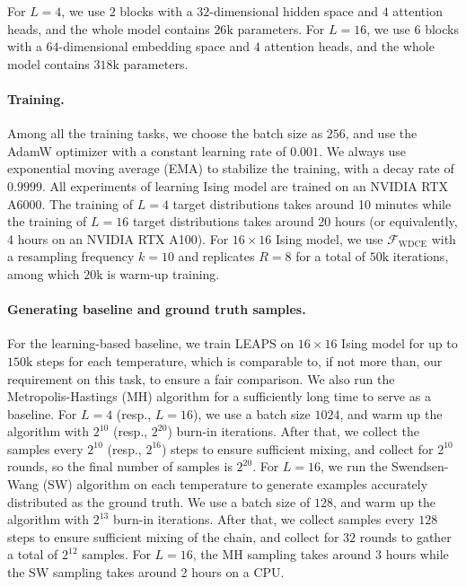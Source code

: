 \documentclass{article}
\theoremstyle{remark}
\newcommand{\cF}{\mathcal{F}}
\begin{document}
For $L=4$, we use $2$ blocks with a $32$-dimensional hidden space and $4$ attention heads, and the whole model contains $26\mathrm{k}$ parameters. 
For $L=16$, we use $6$ blocks with a $64$-dimensional embedding space and $4$ attention heads, and the whole model contains $318\mathrm{k}$ parameters.


\paragraph{Training.}
Among all the training tasks, we choose the batch size as $256$, and use the AdamW optimizer \cite{loshchilov2018decoupled} with a constant learning rate of $0.001$. We always use exponential moving average (EMA) to stabilize the training, with a decay rate of $0.9999$. All experiments of learning Ising model are trained on an NVIDIA RTX A6000. The training of $L=4$ target distributions takes around 10 minutes while the training of $L=16$ target distributions takes around 20 hours (or equivalently, 4 hours on an NVIDIA RTX A100). For $16\times16$ Ising model, we use $\cF_{\mathrm{WDCE}}$ with a resampling frequency $k = 10$ and replicates $R=8$ for a total of $50\mathrm{k}$ iterations, among which $20\mathrm{k}$ is warm-up training.

%

\paragraph{Generating baseline and ground truth samples.} For the learning-based baseline, we train LEAPS on $16 \times 16$ Ising model for up to $150\mathrm{k}$ steps for each temperature, which is comparable to, if not more than, our requirement on this task, to ensure a fair comparison. We also run the Metropolis-Hastings (MH) algorithm for a sufficiently long time to serve as a baseline. For $L=4$ (resp., $L=16$), we use a batch size $1024$, and warm up the algorithm with $2^{10}$ (resp., $2^{20}$) burn-in iterations. After that, we collect the samples every $2^{10}$ (resp., $2^{16}$) steps to ensure sufficient mixing, and collect for $2^{10}$ rounds, so the final number of samples is $2^{20}$. For $L = 16$, we run the Swendsen-Wang (SW) algorithm on each temperature to generate examples accurately distributed as the ground truth. We use a batch size of $128$, and warm up the algorithm with $2^{13}$ burn-in iterations. After that, we collect samples every $128$ steps to ensure sufficient mixing of the chain, and collect for $32$ rounds to gather a total of $2^{12}$ samples. For $L=16$, the MH sampling takes around 3 hours while the SW sampling takes around 2 hours on a CPU.
\end{document}
